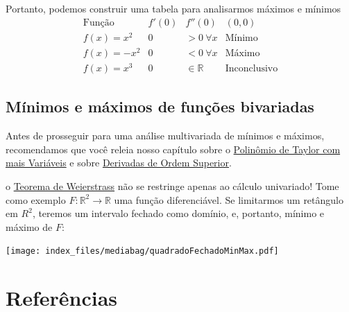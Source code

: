 \documentclass[
  letterpaper,
  DIV=11,
  numbers=noendperiod]{scrreprt}
\begin{document}
Portanto, podemos construir uma tabela para analisarmos máximos e
mínimos \[
\begin{array}{c|c|c|c}
    \text{Função} & f'(0) & f''(0) & (0,0) \\
    \hline
    f(x) = x^2 &  0 &  > 0 ~\forall x & \text{Mínimo} \\
    f(x) = -x^2 &  0 &  < 0 ~\forall x & \text{Máximo} \\
    f(x) = x^3 &  0 &  \in \mathbb{R} & \text{Inconclusivo} 
\end{array}
\]

\section{Mínimos e máximos de funções
bivariadas}\label{muxednimos-e-muxe1ximos-de-funuxe7uxf5es-bivariadas}

Antes de prosseguir para uma análise multivariada de mínimos e máximos,
recomendamos que você releia nosso capítulo sobre o
\href{taylor-multi.qmd}{Polinômio de Taylor com mais Variáveis} e sobre
\href{d-ordem-superior.qmd}{Derivadas de Ordem Superior}.

o \href{weierstrass.qmd}{Teorema de Weierstrass} não se restringe apenas
ao cálculo univariado! Tome como exemplo
\(F: \mathbb{R}^2 \rightarrow \mathbb{R}\) uma função diferenciável. Se
limitarmos um retângulo em \(R^2\), teremos um intervalo fechado como
domínio, e, portanto, mínimo e máximo de \(F\):

\texttt{[image: index\_files/mediabag/quadradoFechadoMinMax.pdf]}


\chapter*{Referências}\label{referuxeancias}


\printbibliography[heading=none]




\printindex
\end{document}
